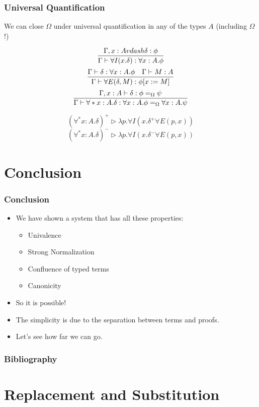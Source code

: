 \begin{frame}
\frametitle{Universal Quantification}

We can close $\Omega$ under universal quantification in any of the types $A$ (including $\Omega$!)

\[ \infer{\Gamma \vdash \forall I (x.\delta) : \forall x : A. \phi}{\Gamma, x : A vdash \delta : \phi} \]
\[ \infer{\Gamma \vdash \forall E(\delta, M) : \phi[x:=M]} {\Gamma \vdash \delta : \forall x :A.\phi \quad \Gamma \vdash M : A} \]
\[ \infer{\Gamma \vdash \forall* x:A.\delta : \forall x:A.\phi =_\Omega \forall x:A.\psi}{\Gamma, x : A \vdash \delta : \phi =_\Omega \psi} \]

\pause

\[ (\forall^* x:A.\delta)^+ \rhd \lambda p. \forall I(x.\delta^+ \forall E(p,x)) \]
\[ (\forall^* x:A.\delta)^- \rhd \lambda p.\forall I(x.\delta^- \forall E(p,x)) \]
\end{frame}

\section{Conclusion}

\begin{frame}
\frametitle{Conclusion}
\begin{itemize}[<+->]
\item
We have shown a system that has all these properties:
\begin{itemize}
\item
Univalence
\item
Strong Normalization
\item
Confluence of typed terms
\item
Canonicity
\end{itemize}
\item
So it is possible!
\item
The simplicity is due to the separation between terms and proofs.
\item
Let's see how far we can go.
\end{itemize}
\end{frame}

\begin{frame}
\frametitle{Bibliography}

\end{frame}

\appendix

\section{Replacement and Substitution}
\label{appendix:repsub}















